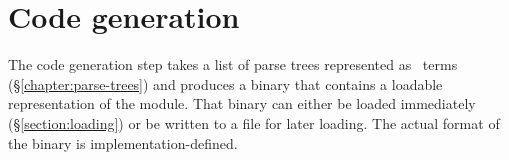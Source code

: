 \section{Code generation}

\label{section:code-generation}

The code generation step takes a list of parse trees represented as \Erlang\ terms
(\S\ref{chapter:parse-trees}) and produces a binary that contains a loadable
representation of the module.
That binary can either be loaded immediately
(\S\ref{section:loading}) or be written to a file for later loading.
The actual format of the binary is implementation-defined.

\iffalse
\section{Loading a module}

\label{section:loading}

A binary is either available immediately, for example, directly from code generation
(\S\ref{section:loading}) or read from a file.

Loading the binary results in a \emph{module term}, as 
described in \S\ref{section:module-terms}.  It is also possible to update
the mapping of module names to module terms on the node onto which the binary is loaded,
as described in \S\ref{section:module-names}.
\fi
